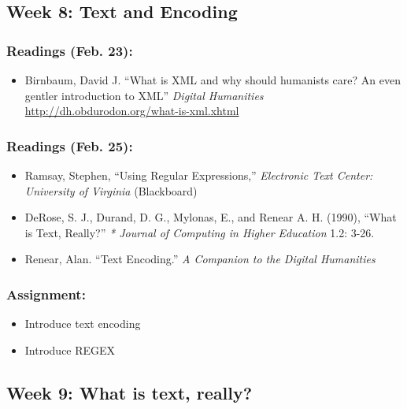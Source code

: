 \documentclass[]{article}
\begin{document}
\subsection{Week 8: Text and Encoding}\label{week-8-text-and-encoding}

\subsubsection{Readings (Feb. 23):}\label{readings-feb.-23}

\begin{itemize}
\itemsep1pt\parskip0pt
\item
  Birnbaum, David J. ``What is XML and why should humanists care? An
  even gentler introduction to XML'' \emph{Digital Humanities}
  \url{http://dh.obdurodon.org/what-is-xml.xhtml}
\end{itemize}

\subsubsection{Readings (Feb. 25):}\label{readings-feb.-25}

\begin{itemize}
\itemsep1pt\parskip0pt
\item
  Ramsay, Stephen, ``Using Regular Expressions,'' \emph{Electronic Text
  Center: University of Virginia} (Blackboard)
\item
  DeRose, S. J., Durand, D. G., Mylonas, E., and Renear A. H. (1990),
  ``What is Text, Really?'' \emph{* Journal of Computing in Higher
  Education} 1.2: 3-26.
\item
  Renear, Alan. ``Text Encoding.'' \emph{A Companion to the Digital
  Humanities}
\end{itemize}

\subsubsection{Assignment:}\label{assignment-6}

\begin{itemize}
\itemsep1pt\parskip0pt
\item
  Introduce text encoding
\item
  Introduce REGEX
\end{itemize}

\subsection{Week 9: What is text,
really?}\label{week-9-what-is-text-really}
\end{document}
